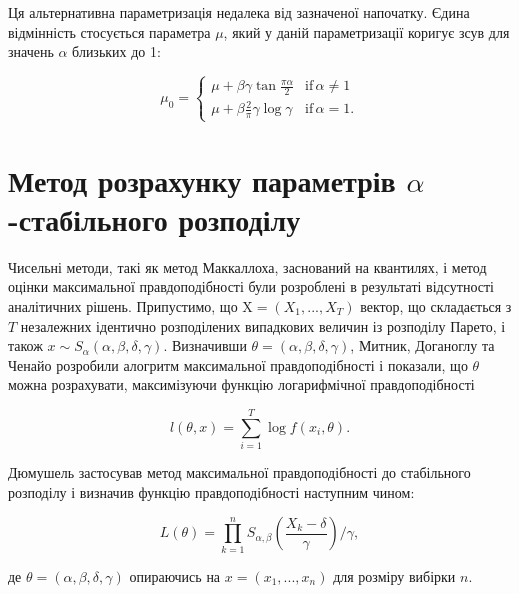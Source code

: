\documentclass[
  letterpaper,
]{report}
\begin{document}
Ця альтернативна параметризація недалека від зазначеної напочатку. Єдина
відмінність стосується параметра \(\mu\), який у даній параметризації
коригує зсув для значень \(\alpha\) близьких до 1:

\[ 
\mu_{0} = \begin{cases} \mu + \beta\gamma\tan{\frac{\pi\alpha}{2}} & \text{if} \, \alpha \neq 1 \\ \mu + \beta\frac{2}{\pi}\gamma\log{\gamma} & \text{if} \, \alpha = 1. \end{cases} 
\]

\hypertarget{ux43cux435ux442ux43eux434-ux440ux43eux437ux440ux430ux445ux443ux43dux43aux443-ux43fux430ux440ux430ux43cux435ux442ux440ux456ux432-alpha-ux441ux442ux430ux431ux456ux43bux44cux43dux43eux433ux43e-ux440ux43eux437ux43fux43eux434ux456ux43bux443}{%
\section{\texorpdfstring{Метод розрахунку параметрів
\(\alpha\)-стабільного
розподілу}{Метод розрахунку параметрів \textbackslash alpha-стабільного розподілу}}\label{ux43cux435ux442ux43eux434-ux440ux43eux437ux440ux430ux445ux443ux43dux43aux443-ux43fux430ux440ux430ux43cux435ux442ux440ux456ux432-alpha-ux441ux442ux430ux431ux456ux43bux44cux43dux43eux433ux43e-ux440ux43eux437ux43fux43eux434ux456ux43bux443}}

Чисельні методи, такі як метод Маккаллоха, заснований на квантилях, і
метод оцінки максимальної правдоподібності були розроблені в результаті
відсутності аналітичних рішень. Припустимо, що
\(\text{X} = (X_1, ... , X_T)\) вектор, що складається з \(T\)
незалежних ідентично розподілених випадкових величин із розподілу
Парето, і також \(x \sim S_{\alpha}(\alpha, \beta, \delta, \gamma)\).
Визначивши \(\theta = (\alpha, \beta, \delta, \gamma)\), Митник,
Доганоглу та Ченайо розробили алогритм максимальної правдоподібності і
показали, що \(\theta\) можна розрахувати, максимізуючи функцію
логарифмічної правдоподібності

\[ 
l(\theta, x) = \sum_{i=1}^{T}\log{f(x_{i}, \theta)}.
\]

Дюмушель застосував метод максимальної правдоподібності до стабільного
розподілу і визначив функцію правдоподібності наступним чином:

\[ 
L(\theta) = \prod_{k=1}^{n}S_{\alpha,\beta} \left( \frac{X_{k} - \delta}{\gamma} \right) \Big/ \gamma, 
\]

де \(\theta = (\alpha, \beta, \delta, \gamma)\) опираючись на
\(x = (x_1, ... , x_n)\) для розміру вибірки \(n\).
\end{document}
